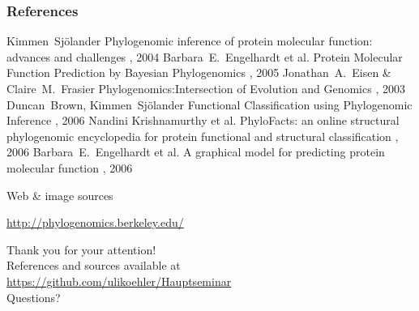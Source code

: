 \documentclass[14pt,xcolor=dvipsnames,pdftex]{beamer}
\begin{document}
\begin{frame}
  \frametitle<presentation>{References}    
  \begin{thebibliography}{10}
  \tiny
  \beamertemplatearticlebibitems
  \bibitem{}
    Kimmen~Sjölander
    \newblock Phylogenomic inference of protein molecular function: advances and challenges
    , 2004
  \bibitem{}
    Barbara~E.~Engelhardt et al.
    \newblock Protein Molecular Function Prediction by Bayesian Phylogenomics
    , 2005
  \bibitem{}
    Jonathan~A.~Eisen \& Claire~M.~Frasier
    \newblock Phylogenomics:Intersection of Evolution and Genomics
    , 2003
  \bibitem{}
    Duncan~Brown, Kimmen~Sjölander
    \newblock Functional Classification using Phylogenomic Inference
    , 2006
  \bibitem{}
    Nandini Krishnamurthy et al.
    \newblock PhyloFacts: an online structural phylogenomic encyclopedia for protein functional and structural classification
    , 2006
  \bibitem{}
    Barbara~E.~Engelhardt et al.
    \newblock A graphical model for predicting protein molecular function
    , 2006
  \end{thebibliography}
\end{frame}

\begin{frame}{Web \& image sources}
 \begin{center}
  \url{http://phylogenomics.berkeley.edu/}
 \end{center}

\end{frame}


\begin{frame}
 \begin{center}
 {\color{BlueViolet}\large Thank you for your attention!}\\[1cm]
 {\small References and sources available at}\\
 {\small \url{https://github.com/ulikoehler/Hauptseminar}}\\[1cm]
 {\color{BlueViolet}\large Questions?}\\[1cm]
 \end{center}
\end{frame}
\end{document}
